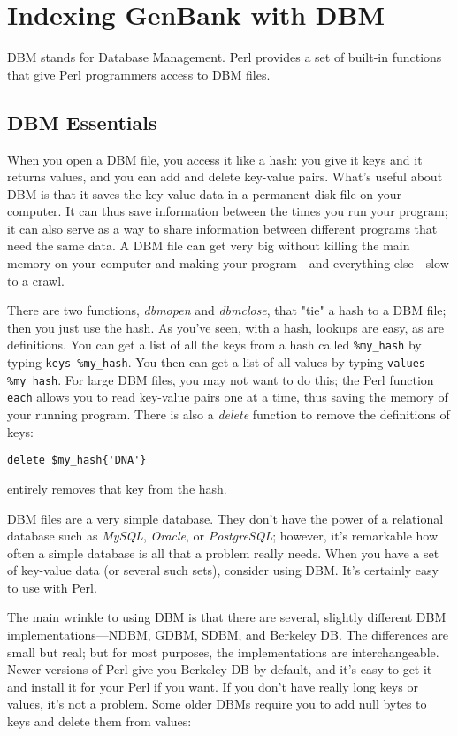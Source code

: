 \section{Indexing GenBank with DBM}
DBM stands for Database Management. Perl provides a set of built-in functions that give Perl programmers access to DBM files. 

\subsection{DBM Essentials}
When you open a DBM file, you access it like a hash: you give it keys and it returns values, and you can add and delete key-value pairs.  What's useful about DBM is that it saves the key-value data in a permanent disk file on your computer. It can thus save information between the times you run your program; it can also serve as a way to share information between different programs that need the same data. A DBM file can get very big without killing the main memory on your computer and making your program—and everything else—slow to a crawl.

There are two functions, \textit{dbmopen} and \textit{dbmclose}, that "tie" a hash to a DBM file; then you just use the hash. As you've seen, with a hash, lookups are easy, as are definitions. You can get a list of all the keys from a hash called \verb|%my_hash| by typing \verb|keys %my_hash|. You then can get a list of all values by typing \verb|values %my_hash|. For large DBM files, you may not want to do this; the Perl function \verb|each| allows you to read key-value pairs one at a time, thus saving the memory of your running program. There is also a \textit{delete} function to remove the definitions of keys: 

\begin{lstlisting}
delete $my_hash{'DNA'}
\end{lstlisting}

entirely removes that key from the hash.

DBM files are a very simple database. They don't have the power of a relational database such as \textit{MySQL}, \textit{Oracle}, or \textit{PostgreSQL}; however, it's remarkable how often a simple database is all that a problem really needs. When you have a set of key-value data (or several such sets), consider using DBM. It's certainly easy to use with Perl.

The main wrinkle to using DBM is that there are several, slightly different DBM implementations—NDBM, GDBM, SDBM, and Berkeley DB. The differences are small but real; but for most purposes, the implementations are interchangeable. Newer versions of Perl give you Berkeley DB by default, and it's easy to get it and install it for your Perl if you want. If you don't have really long keys or values, it's not a problem. Some older DBMs require you to add null bytes to keys and delete them from values: 

